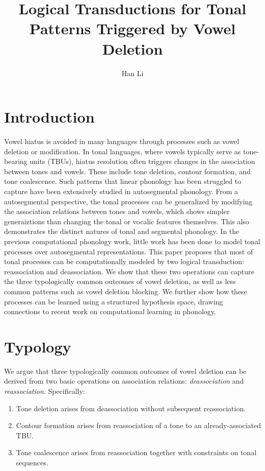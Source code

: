 \documentclass{article}
\title{Logical Transductions for Tonal Patterns Triggered by Vowel Deletion}
\author{Han Li}
\date{}
\begin{document}
\maketitle
\section{Introduction}
Vowel hiatus is avoided in many languages through processes such as vowel
deletion or modification. In tonal languages, where vowels typically serve 
as tone-bearing units (TBUs), hiatus resolution often triggers changes in 
the association between tones and vowels. These include tone deletion, 
contour formation, and tone coalescence. Such patterns that linear phonology
has been struggled to capture have been extensively studied in autosegmental
phonology. From a autosegmental perspective, the tonal processes can be 
generalized by modifying the association relations between tones and vowels, 
which shows simpler generaiztions than changing the tonal or vocalic features 
themselves. This also demonstrates the distinct natures of tonal and segmental 
phonology.
In the previous computational phonology work, little work has been done to 
model tonal processes over autosegmental representations. This paper proposes 
that most of tonal processes can be computationally modeled by two logical
transduction: reassociation and deassociation. We show that these two 
operations can capture the three typologically common outcomes of vowel 
deletion, as well as less common patterns such as vowel deletion blocking. We 
further show how these processes can be learned using a structured hypothesis 
space, drawing connections to recent work on computational learning in 
phonology.


\section{Typology}
We argue that three typologically common outcomes of vowel deletion 
can be derived from two basic operations on association relations: 
\textit{deassociation} and \textit{reassociation}. Specifically:
\begin{enumerate}
    \item Tone deletion arises from deassociation without subsequent reassociation.
    \item Contour formation arises from reassociation of a tone to an already-associated TBU.
    \item Tone coalescence arises from reassociation together with constraints on tonal sequences.
\end{enumerate}
\end{document}
